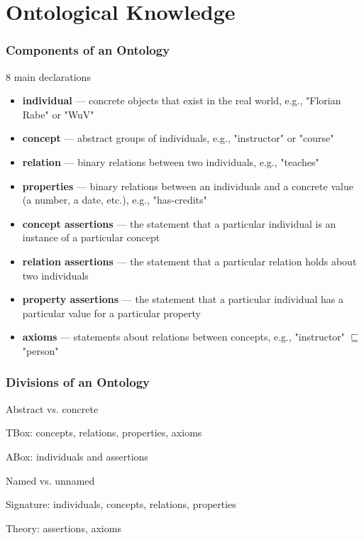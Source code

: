\section{Ontological Knowledge}

\begin{frame}\frametitle{Components of an Ontology}
8 main declarations
\begin{itemize}
 \item \textbf{individual} --- concrete objects that exist in the real world, e.g., "Florian Rabe" or "WuV"
 \item \textbf{concept} --- abstract groups of individuals, e.g., "instructor" or "course"
 \item \textbf{relation} --- binary relations between two individuals, e.g., "teaches"
 \item \textbf{properties} --- binary relations between an individuals and a concrete value (a number, a date, etc.), e.g., "has-credits"
 \item \textbf{concept assertions} --- the statement that a particular individual is an instance of a particular concept
 \item \textbf{relation assertions} --- the statement that a particular relation holds about two individuals
 \item \textbf{property assertions} --- the statement that a particular individual has a particular value for a particular property
 \item \textbf{axioms} --- statements about relations between concepts, e.g., "instructor" $\sqsubseteq$ "person"
\end{itemize}
\end{frame}

\begin{frame}\frametitle{Divisions of an Ontology}
\begin{blockitems}{Abstract vs. concrete}
 \item TBox: concepts, relations, properties, axioms
 \item ABox: individuals and assertions
\end{blockitems}

\begin{blockitems}{Named vs. unnamed}
 \item Signature: individuals, concepts, relations, properties 
 \item Theory: assertions, axioms
\end{blockitems}
\end{frame}

